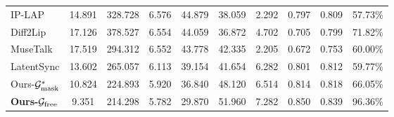 \begin{table}[!t]
{\begin{tabular}{@{}lccccccccc@{}}
IP-LAP                   & 14.891                         & 328.728                         & 6.576                         & 44.879                         & 38.059                         & 2.292                         & 0.797                         & 0.809                         & 57.73\%                         \\
Diff2Lip                 & 17.126                         & 378.527                         & 6.554                         & 44.059                         & 36.872                         & 4.702                         & 0.705                         & 0.799                         & \cellcolor[HTML]{FFDA8F}71.82\% \\
MuseTalk                 & 17.519                         & 294.312                           & 6.552                         & 43.778                         & 42.335                         & 2.205                         & 0.672                         & 0.753                         & 60.00\%                         \\
LatentSync               & \cellcolor[HTML]{FFFFC7}13.602 & \cellcolor[HTML]{FFFFC7}265.057 & \cellcolor[HTML]{FFFFC7}6.113 & 39.154                         & 41.654                         & \cellcolor[HTML]{FFFFC7}6.282  & \cellcolor[HTML]{FFFFC7}0.801 & \cellcolor[HTML]{FFFFC7}0.812 & 59.77\%                         \\ \midrule
Ours-$\mathcal{G}_{\text{mask}}^*$                 & \cellcolor[HTML]{FFDA8F}10.824 & \cellcolor[HTML]{FFDA8F}224.893 & \cellcolor[HTML]{FFDA8F}5.920 & \cellcolor[HTML]{FFDA8F}36.840 & \cellcolor[HTML]{FFDA8F}48.120 & \cellcolor[HTML]{FFDA8F}6.514 & \cellcolor[HTML]{FFDA8F}0.814 & \cellcolor[HTML]{FFDA8F}0.818 & 66.05\%                         \\
\textbf{\textbf{Ours-$\mathcal{G}_{\text{free}}$}}        & \cellcolor[HTML]{FE996B}9.351  & \cellcolor[HTML]{FE996B}214.298 & \cellcolor[HTML]{FE996B}5.782 & \cellcolor[HTML]{FE996B}29.870 & \cellcolor[HTML]{FE996B}51.960 & \cellcolor[HTML]{FE996B}7.282 & \cellcolor[HTML]{FE996B}0.850 & \cellcolor[HTML]{FE996B}0.839 & \cellcolor[HTML]{FE996B}96.36\% \\ \bottomrule
\end{tabular}
}
\vspace{-10pt}
\end{table}
